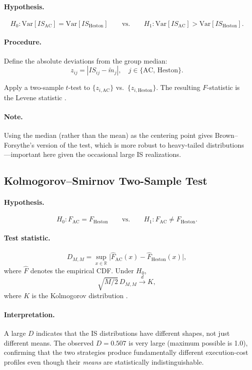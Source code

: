 \documentclass[11pt]{article}
\begin{document}
\paragraph{Hypothesis.}
\[
H_0: \mathrm{Var}[IS_{\text{AC}}] = \mathrm{Var}[IS_{\text{Heston}}] \qquad \text{vs.} \qquad H_1: \mathrm{Var}[IS_{\text{AC}}] > \mathrm{Var}[IS_{\text{Heston}}].
\]

\paragraph{Procedure.} Define the absolute deviations from the group median:
\[
z_{ij} = |IS_{ij} - \tilde{m}_j|, \quad j \in \{\text{AC, Heston}\}.
\]

Apply a two-sample $t$-test to $\{z_{i,\text{AC}}\}$ vs.\ $\{z_{i,\text{Heston}}\}$. The resulting $F$-statistic is the Levene statistic \cite{levene1960robust}\cite{brown1974robust}.

\paragraph{Note.} Using the median (rather than the mean) as the centering point gives Brown--Forsythe's version of the test, which is more robust to heavy-tailed distributions---important here given the occasional large IS realizations.

\subsection{Kolmogorov--Smirnov Two-Sample Test}

\paragraph{Hypothesis.}
\[
H_0: F_{\text{AC}} = F_{\text{Heston}} \qquad \text{vs.} \qquad H_1: F_{\text{AC}} \neq F_{\text{Heston}}.
\]

\paragraph{Test statistic.}
\[
D_{M,M} = \sup_{x \in \mathbb{R}}\bigl|\hat{F}_{\text{AC}}(x) - \hat{F}_{\text{Heston}}(x)\bigr|,
\]
where $\hat{F}$ denotes the empirical CDF. Under $H_0$,
\[
\sqrt{M/2}\,D_{M,M} \overset{d}{\to} K,
\]
where $K$ is the Kolmogorov distribution \cite{kolmogorov1933sulla}\cite{smirnov1948table}.

\paragraph{Interpretation.} A large $D$ indicates that the IS distributions have different shapes, not just different means. The observed $D = 0.507$ is very large (maximum possible is 1.0), confirming that the two strategies produce fundamentally different execution-cost profiles even though their \emph{means} are statistically indistinguishable.
\end{document}
